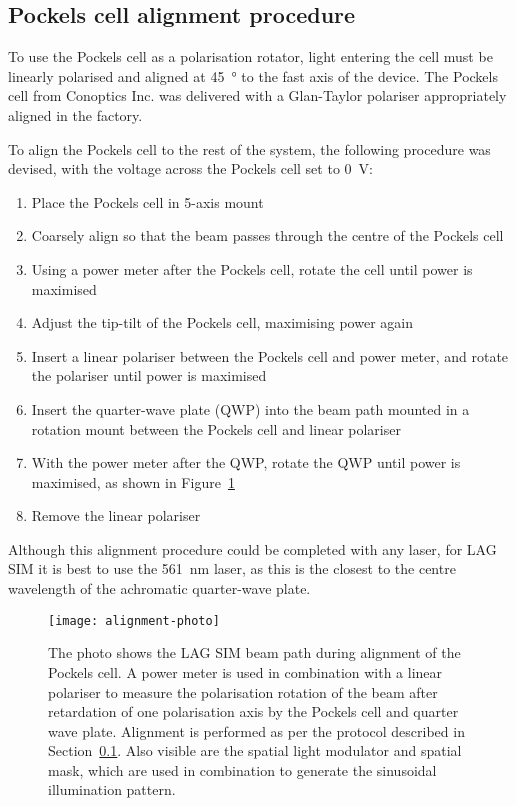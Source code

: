 \subsection{Pockels cell alignment procedure} \label{sec:alignment-procedure}
To use the Pockels cell as a polarisation rotator, light entering the cell must be linearly polarised and aligned at \SI{45}{\degree} to the fast axis of the device.
The Pockels cell from Conoptics Inc. was delivered with a Glan-Taylor polariser appropriately aligned in the factory.

To align the Pockels cell to the rest of the system, the following procedure was devised, with the voltage across the Pockels cell set to \SI{0}{\volt}: %
\begin{enumerate}
	\item Place the Pockels cell in 5-axis mount
	\item Coarsely align so that the beam passes through the centre of the Pockels cell
	\item Using a power meter after the Pockels cell, rotate the cell until power is maximised
	\item Adjust the tip-tilt of the Pockels cell, maximising power again
	\item Insert a linear polariser between the Pockels cell and power meter, and rotate the polariser until power is maximised
	\item Insert the quarter-wave plate (QWP) into the beam path mounted in a rotation mount between the Pockels cell and linear polariser
	\item With the power meter after the QWP, rotate the QWP until power is maximised, as shown in Figure~\ref{fig:alignment-photo}
	\item Remove the linear polariser
\end{enumerate}

Although this alignment procedure could be completed with any laser, for LAG SIM it is best to use the \SI{561}{\nano\metre} laser, as this is the closest to the centre wavelength of the achromatic quarter-wave plate.

\begin{figure}[htbp!]
\centering
\texttt{[image: alignment-photo]}
\caption[LAG SIM: Alignment of the Pockels cell and quarter-wave plate to facilitate fast linear polarisation rotation]{The photo shows the LAG SIM beam path during alignment of the Pockels cell. A power meter is used in combination with a linear polariser to measure the polarisation rotation of the beam after retardation of one polarisation axis by the Pockels cell and quarter wave plate. Alignment is performed as per the protocol described in Section~\ref{sec:alignment-procedure}. Also visible are the spatial light modulator and spatial mask, which are used in combination to generate the sinusoidal illumination pattern.}
\label{fig:alignment-photo}
\end{figure}


